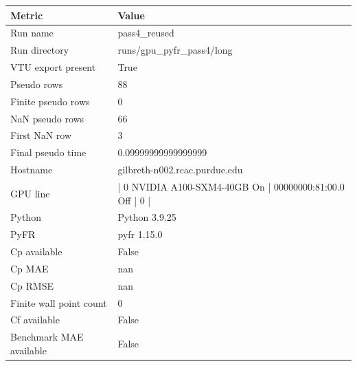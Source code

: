 \begin{tabular}{ll}
\toprule
Metric & Value\\
\midrule
Run name & pass4\_reused\\
Run directory & runs/gpu\_pyfr\_pass4/long\\
VTU export present & True\\
Pseudo rows & 88\\
Finite pseudo rows & 0\\
NaN pseudo rows & 66\\
First NaN row & 3\\
Final pseudo time & 0.09999999999999999\\
Hostname & gilbreth-n002.rcac.purdue.edu\\
GPU line & |   0  NVIDIA A100-SXM4-40GB          On  |   00000000:81:00.0 Off |                    0 |\\
Python & Python 3.9.25\\
PyFR & pyfr 1.15.0\\
Cp available & False\\
Cp MAE & nan\\
Cp RMSE & nan\\
Finite wall point count & 0\\
Cf available & False\\
Benchmark MAE available & False\\
\bottomrule
\end{tabular}
